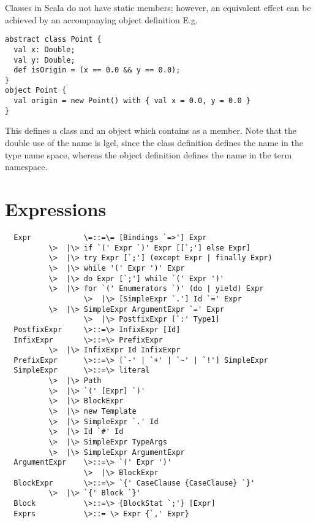 \documentclass[11pt]{report}
\begin{document}
\example
Classes in Scala do not have static members; however, an equivalent
effect can be achieved by an accompanying object definition
E.g.
\begin{verbatim}
abstract class Point {
  val x: Double;
  val y: Double;
  def isOrigin = (x == 0.0 && y == 0.0);
}
object Point {
  val origin = new Point() with { val x = 0.0, y = 0.0 }
}
\end{verbatim}
This defines a class \verb@Point@ and an object \verb@Point@ which
contains \verb@origin@ as a member.  Note that the double use of the
name \verb@Point@ is lgel, since the class definition defines the name
\verb@Point@ in the type name space, whereas the object definition
defines the name in the term namespace.


\chapter{Expressions}
\label{sec:exprs}

\syntax\begin{verbatim}
  Expr            \=::=\= [Bindings `=>'] Expr
		  \>  |\> if `(' Expr `)' Expr [[`;'] else Expr]
		  \>  |\> try Expr [`;'] (except Expr | finally Expr)
		  \>  |\> while '(' Expr ')' Expr
		  \>  |\> do Expr [`;'] while `(' Expr ')'
		  \>  |\> for `(' Enumerators `)' (do | yield) Expr
                  \>  |\> [SimpleExpr `.'] Id `=' Expr
		  \>  |\> SimpleExpr ArgumentExpr `=' Expr
                  \>  |\> PostfixExpr [`:' Type1]
  PostfixExpr     \>::=\> InfixExpr [Id]
  InfixExpr       \>::=\> PrefixExpr
		  \>  |\> InfixExpr Id InfixExpr
  PrefixExpr      \>::=\> [`-' | `+' | `~' | `!'] SimpleExpr 
  SimpleExpr      \>::=\> literal
		  \>  |\> Path
		  \>  |\> `(' [Expr] `)'
		  \>  |\> BlockExpr
		  \>  |\> new Template 
		  \>  |\> SimpleExpr `.' Id 
		  \>  |\> Id `#' Id 
		  \>  |\> SimpleExpr TypeArgs
		  \>  |\> SimpleExpr ArgumentExpr
  ArgumentExpr    \>::=\> `(' Expr ')'
                  \>  |\> BlockExpr
  BlockExpr       \>::=\> `{' CaseClause {CaseClause} `}'
		  \>  |\> `{' Block `}'
  Block           \>::=\> {BlockStat `;'} [Expr]
  Exprs           \>::= \> Expr {`,' Expr}
\end{verbatim}
\end{document}
